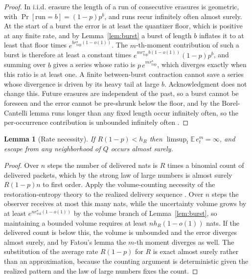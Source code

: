 \documentclass[journal]{IEEEtran}
\newtheorem{lemma}{Lemma}
\theoremstyle{definition}
\theoremstyle{remark}
\newcommand{\rvol}{r^\star_{\mathrm{vol}}}
\newcommand{\rtop}{r^\star_{\mathrm{top}}}
\newcommand{\hR}{h_R}
\newcommand{\E}{\mathbb{E}}
\begin{document}
\begin{proof}
In i.i.d. erasure the length of a run of consecutive erasures is geometric, with $\Pr[\text{run}=b]=(1-p)p^{b}$,
and runs recur infinitely often almost surely. At the start of a burst the error is at least the quantizer floor,
which is positive at any finite rate, and by Lemma~\ref{lem:burst} a burst of length $b$ inflates it to at least
that floor times $e^{b\rtop(1-o(1))}$. The $m$-th-moment contribution of such a burst is therefore at least a
constant times $e^{m\rtop b(1-o(1))}(1-p)p^{b}$, and summing over $b$ gives a series whose ratio is
$p\,e^{m\rtop}$, which diverges exactly when this ratio is at least one. A finite between-burst contraction cannot
save a series whose divergence is driven by its heavy tail at large $b$. Acknowledgment does not change this.
Future erasures are independent of the past, so a burst cannot be foreseen and the error cannot be pre-shrunk
below the floor, and by the Borel-Cantelli lemma runs longer than any fixed length occur infinitely often, so the
per-occurrence contribution is unbounded infinitely often \cite{sahaimitter2006,shannon1948}.
\end{proof}

\begin{lemma}[Rate necessity]\label{lem:rate}
If $R(1-p)<\hR$ then $\limsup_{t}\E\,e_t^{m}=\infty$, and escape from any neighborhood of $Q$ occurs almost
surely.
\end{lemma}

\begin{proof}
Over $n$ steps the number of delivered nats is $R$ times a binomial count of delivered packets, which by the
strong law of large numbers is almost surely $R(1-p)n$ to first order. Apply the volume-counting necessity of the
restoration-entropy theory to the realized delivery sequence \cite{matveevpogromsky2019}. Over $n$ steps the
observer receives at most this many nats, while the uncertainty volume grows by at least $e^{n\rvol(1-o(1))}$ by
the volume branch of Lemma~\ref{lem:burst}, so maintaining a bounded volume requires at least $n\hR(1-o(1))$ nats.
If the delivered count is below this, the volume is unbounded and the error diverges almost surely, and by
Fatou's lemma the $m$-th moment diverges as well. The substitution of the average rate $R(1-p)$ for $R$ is exact
almost surely rather than an approximation, because the counting argument is deterministic given the realized
pattern and the law of large numbers fixes the count.
\end{proof}
\end{document}
